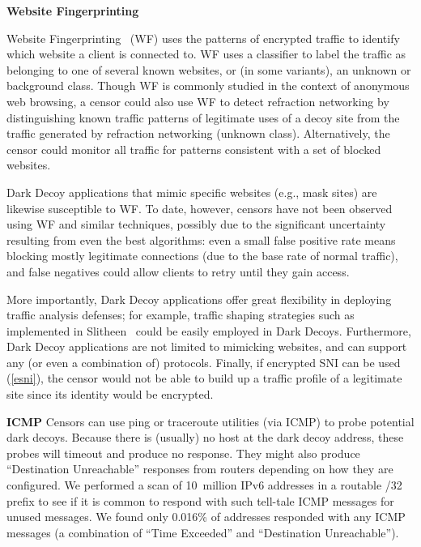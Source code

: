 \documentclass[letterpaper,twocolumn,10pt]{article}
\renewcommand{\paragraph}[1]{\smallskip\noindent\textbf{#1\quad}}
\begin{document}
\paragraph{Website Fingerprinting}

Website Fingerprinting~\cite{kNN,kFP,DLFP} (WF) uses the patterns of encrypted traffic to identify which website a client is connected to. WF uses a classifier to label the traffic as belonging to one of several known websites, or (in some variants), an unknown or background class. Though WF is commonly studied in the context of anonymous web browsing, a censor could also use WF to detect refraction networking by distinguishing known traffic patterns of legitimate uses of a decoy site from the traffic generated by refraction networking (unknown class). Alternatively, the censor could monitor all traffic for patterns consistent with a set of blocked websites.

Dark Decoy applications that mimic specific websites (e.g., mask sites) are likewise susceptible to WF. To date, however, censors have not been observed using WF and similar techniques, possibly due to the significant uncertainty resulting from even the best algorithms: even a small false
positive rate means blocking mostly legitimate connections (due to the base rate
of normal traffic), and false negatives could allow clients to retry until they
gain access.

More importantly, Dark Decoy applications offer great flexibility in deploying traffic analysis defenses; for example, traffic shaping strategies such as implemented in Slitheen~\cite{slitheen16} could be easily employed in Dark Decoys. Furthermore,
Dark Decoy applications are not limited to mimicking websites, and can support
any (or even a combination of) protocols. Finally, if encrypted SNI can be used (\cref{esni}), the censor would not be able to build up a traffic profile of a legitimate site since its identity would be encrypted.

\paragraph{ICMP}
Censors can use ping or traceroute utilities (via ICMP) to probe potential dark
decoys. Because there is (usually) no host at the dark decoy address, these
probes will timeout and produce no response. They might also produce
``Destination Unreachable'' responses from routers depending on how they are
configured. We performed a scan of 10~million IPv6 addresses in a routable /32
prefix to see if it is common to respond with such tell-tale ICMP messages for
unused messages. We found only 0.016\% of addresses responded with any ICMP
messages (a combination of ``Time Exceeded'' and ``Destination Unreachable'').
\end{document}
